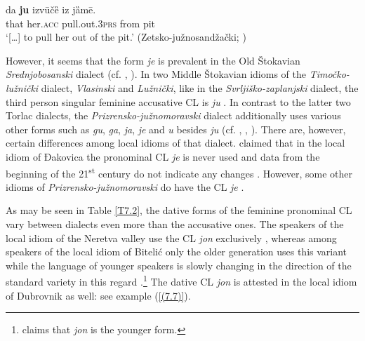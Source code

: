 \begin{exe}\ex\label{(7.6)}
\gll [\dots] da \textbf{ju} izvūčȅ iz jȁmē. \\
{} that  her.\textsc{acc} pull.out.3\textsc{prs}  from pit \\
\glt ‘[\dots] to pull her out of the pit.’
\hfill  (Zetsko-južnosandžački; \citealt[189]{Okuka08})
\end{exe}

\noindent However, it seems that the form \textit{je} is prevalent in the Old Štokavian \textit{Srednjobosanski} dialect (cf. \citealt[126]{Brozovic07}, \citealt[58]{HTS09}). In two Middle Štokavian idioms of the \textit{Timočko-lužnički} dialect, \textit{Vlasinski} and \textit{Lužnički}, like in the \textit{Svrljiško-zaplanjski} dialect, the third person singular feminine accusative CL is \textit{ju} \citep[cf.][272f, 254]{Okuka08}. In contrast to the latter two Torlac dialects, the \textit{Prizrensko-južnomoravski} dialect additionally uses various other forms such as \textit{gu}, \textit{ga}, \textit{ja}, \textit{je} and \textit{u} besides \textit{ju} (cf. \citealt[111]{Stevanovic50}, \citealt[237]{Okuka08}, \citealt[51]{Mladenovic10}). There are, however, certain differences among local idioms of that dialect. \citet[111]{Stevanovic50} claimed that in the local idiom of Đakovica the pronominal CL \textit{je} is never used and data from the beginning of the 21\textsuperscript{st} century do not indicate any changes \citep[cf.][51]{Mladenovic10}. However, some other idioms of \textit{Prizrensko-južnomoravski} do have the CL \textit{je} \citep[cf.][51]{Mladenovic10}.



As may be seen in Table \ref{T7.2}, the dative forms of the feminine pronominal CL vary between dialects even more than the accusative ones. The speakers of the local idiom of the Neretva valley use the CL \textit{jon} exclusively \citep[cf.][143]{VuksaNahod14}, whereas among speakers of the local idiom of Bitelić only the older generation uses this variant while the language of younger speakers is slowly changing in the direction of the standard variety in this regard  \citep[cf.][186]{Curkovic14}.\footnote{\citet[120]{Simundic71} claims that \textit{jon} is the younger form.} The dative CL \textit{jon} is attested in the local idiom of Dubrovnik as well: see example (\ref{(7.7)}).


